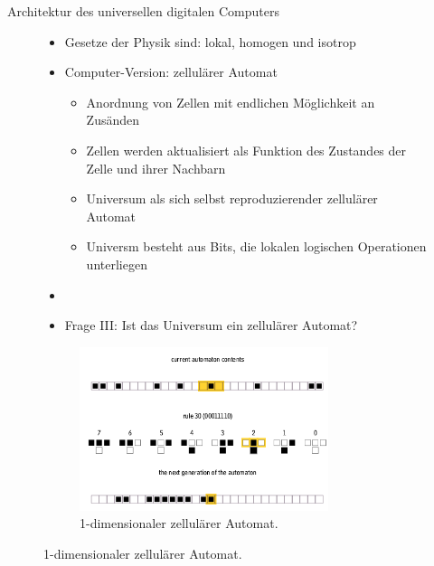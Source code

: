\documentclass[aspectratio=1610, 9pt]{beamer}
\begin{document}
\begin{frame}{Architektur des universellen digitalen Computers}
  \begin{figure}
    \begin{minipage}{0.49\textwidth}
      \begin{itemize}
        \item Gesetze der Physik sind: lokal, homogen und isotrop
        \item[\rightarrow] Computer-Version: zellulärer Automat
        \begin{itemize}
          \item Anordnung von Zellen mit endlichen Möglichkeit an Zusänden
          \item Zellen werden aktualisiert als Funktion des Zustandes der Zelle und ihrer Nachbarn
          \item Universum als sich selbst reproduzierender zellulärer Automat
          \item Universm besteht aus Bits, die lokalen logischen Operationen unterliegen
        \end{itemize}
        \item[]
        \item[\rightarrow] Frage III: Ist das Universum ein zellulärer Automat?
      \end{itemize}
    \end{minipage}
    \hfill
    \begin{minipage}{0.49\textwidth}
      \begin{figure}
        \includegraphics[width=0.8\textwidth]{images/zelle.png}
        \caption{1-dimensionaler zellulärer Automat.}
      \end{figure}
    \end{minipage}
  \end{figure}


\end{frame}
\end{document}
